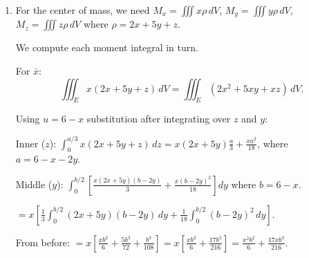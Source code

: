\begin{enumerate}
\begin{enumerate}
So first part $= \frac{1}{3}\left(\frac{xb^2}{2}+\frac{5b^3}{24}\right) = \frac{xb^2}{6}+\frac{5b^3}{72}$.

Second part: $\frac{1}{18}\int_0^{b/2}(b-2y)^2\,dy$. Let $t = b-2y$:
$= \frac{1}{18}\cdot\frac{1}{2}\int_0^b t^2\,dt = \frac{1}{36}\cdot\frac{b^3}{3} = \frac{b^3}{108}$.

Middle integral $= \frac{xb^2}{6}+\frac{5b^3}{72}+\frac{b^3}{108} = \frac{xb^2}{6}+b^3\left(\frac{5}{72}+\frac{1}{108}\right) = \frac{xb^2}{6}+b^3\cdot\frac{15+2}{216} = \frac{xb^2}{6}+\frac{17b^3}{216}$.

Outer integral ($x$), $b = 6-x$:
\[
M = \int_0^6\left[\frac{x(6-x)^2}{6}+\frac{17(6-x)^3}{216}\right]dx.
\]

Let $u = 6-x$, $x = 6-u$, $dx = -du$:
\[
M = \int_0^6\left[\frac{(6-u)u^2}{6}+\frac{17u^3}{216}\right]du.
\]

$= \int_0^6\left[u^2-\frac{u^3}{6}+\frac{17u^3}{216}\right]du = \int_0^6\left[u^2+u^3\left(\frac{17}{216}-\frac{1}{6}\right)\right]du = \int_0^6\left[u^2+u^3\cdot\frac{17-36}{216}\right]du$.

$= \int_0^6\left[u^2-\frac{19u^3}{216}\right]du = \left[\frac{u^3}{3}-\frac{19u^4}{864}\right]_0^6 = \frac{216}{3}-\frac{19\cdot 1296}{864} = 72-\frac{24624}{864}$.

$\frac{24624}{864}$: simplify by dividing by 24: $\frac{1026}{36} = \frac{171}{6} = \frac{57}{2} = 28.5$.

$M = 72-28.5 = \boxed{43.5 = \frac{87}{2}}$.

\item For the center of mass, we need $M_x = \iiint x\rho\,dV$, $M_y = \iiint y\rho\,dV$, $M_z = \iiint z\rho\,dV$ where $\rho = 2x+5y+z$.

We compute each moment integral in turn.

For $\bar{x}$:
\[
\iiint_E x(2x+5y+z)\,dV = \iiint_E(2x^2+5xy+xz)\,dV.
\]

Using $u = 6-x$ substitution after integrating over $z$ and $y$:

Inner ($z$): $\int_0^{a/3}x(2x+5y+z)\,dz = x(2x+5y)\frac{a}{3}+\frac{xa^2}{18}$, where $a=6-x-2y$.

Middle ($y$): $\int_0^{b/2}\left[\frac{x(2x+5y)(b-2y)}{3}+\frac{x(b-2y)^2}{18}\right]dy$ where $b=6-x$.

$= x\left[\frac{1}{3}\int_0^{b/2}(2x+5y)(b-2y)\,dy+\frac{1}{18}\int_0^{b/2}(b-2y)^2\,dy\right]$.

From before: $= x\left[\frac{xb^2}{6}+\frac{5b^3}{72}+\frac{b^3}{108}\right] = x\left[\frac{xb^2}{6}+\frac{17b^3}{216}\right] = \frac{x^2 b^2}{6}+\frac{17xb^3}{216}$.


\end{enumerate}
\end{enumerate}
